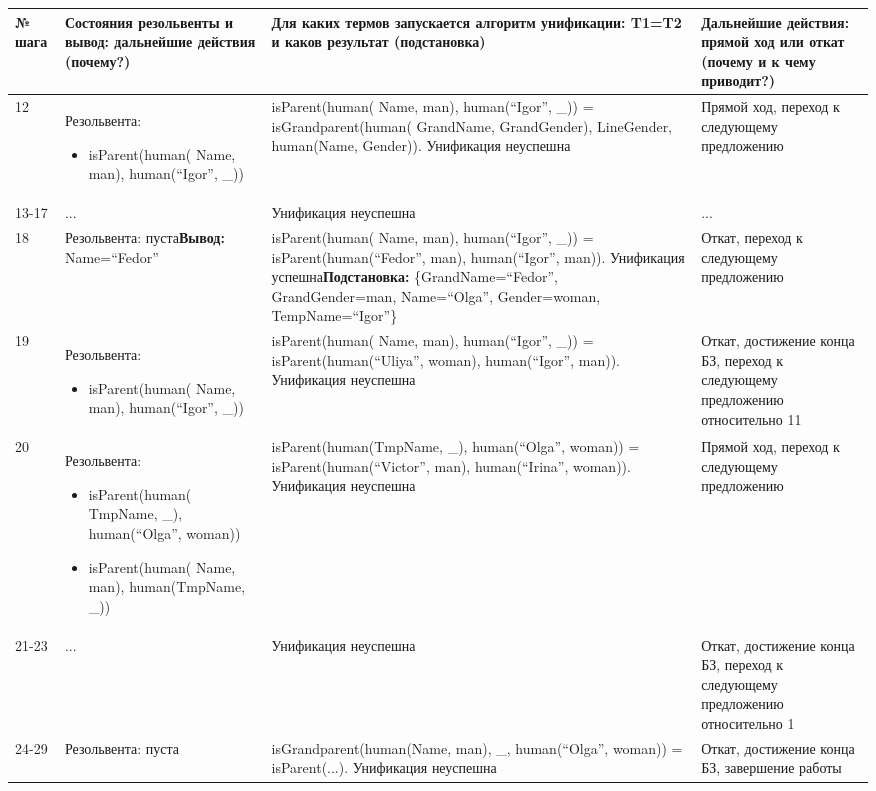 \documentclass[14pt,a4paper]{scrreprt}
\begin{document}
\begin{table}[H]
	\begin{tabular}{|p{0.8cm\small}|p{4.7cm\small}|p{5.7cm\small}|p{4cm\small}|}	
		\hline
		№ шага & Состояния резольвенты и вывод: дальнейшие действия (почему?) & Для каких термов запускается алгоритм унификации: T1=T2 и каков результат (подстановка) & Дальнейшие действия: прямой ход или откат (почему и к чему приводит?)\\
		\hline
		12 & Резольвента:\begin{itemize} \item isParent(human(
			Name, man), human(``Igor'', \_))\end{itemize} & isParent(human(
		Name, man), human(``Igor'', \_)) = isGrandparent(human(
		GrandName, GrandGender), LineGender, human(Name, Gender)). Унификация неуспешна & Прямой ход, переход к следующему предложению\\
		\hline
		13-17 & ... & Унификация неуспешна & ... \\
		\hline
		18 & Резольвента: пуста\linebreak \textbf{Вывод:} Name=``Fedor'' & isParent(human(
		Name, man), human(``Igor'', \_)) = isParent(human(``Fedor'', man), human(``Igor'', man)). Унификация успешна\linebreak \textbf{Подстановка:} \{GrandName=``Fedor'', GrandGender=man, Name=``Olga'', Gender=woman, TempName=``Igor''\} & Откат, переход к следующему предложению\\
		\hline
		19 & Резольвента:\begin{itemize} \item isParent(human(
			Name, man), human(``Igor'', \_))\end{itemize} & isParent(human(
		Name, man), human(``Igor'', \_)) = isParent(human(``Uliya'', woman), human(``Igor'', man)). Унификация неуспешна & Откат, достижение конца БЗ, переход к следующему предложению относительно 11\\
		\hline
		20 & Резольвента:\begin{itemize} \item isParent(human(
			TmpName, \_), human(``Olga'', woman)) \item isParent(human(
			Name, man), human(TmpName, \_))\end{itemize} & isParent(human(TmpName, \_), human(``Olga'', woman)) = isParent(human(``Victor'', man), human(``Irina'', woman)). Унификация неуспешна & Прямой ход, переход к следующему предложению\\
		\hline
		21-23 & ... & Унификация неуспешна & Откат, достижение конца БЗ, переход к следующему предложению относительно 1\\
		\hline
		24-29 & Резольвента: пуста & isGrandparent(human(Name, man), \_, human(``Olga'', woman)) = isParent(...). Унификация неуспешна & Откат, достижение конца БЗ, завершение работы\\
		\hline
	\end{tabular}
\end{table}
		
\end{document}
